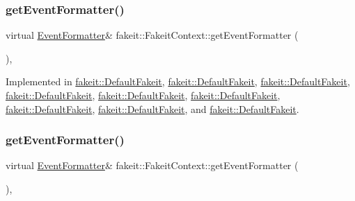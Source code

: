 \mbox{\label{structfakeit_1_1FakeitContext_a066d191292b1002025b02f6569f48b9b}} 
\subsubsection{\texorpdfstring{getEventFormatter()}{getEventFormatter()}\hspace{0.1cm}{\footnotesize\ttfamily [3/9]}}
{\footnotesize\ttfamily virtual \mbox{\hyperlink{structfakeit_1_1EventFormatter}{Event\+Formatter}}\& fakeit\+::\+Fakeit\+Context\+::get\+Event\+Formatter (\begin{DoxyParamCaption}{ }\end{DoxyParamCaption})\hspace{0.3cm}{\ttfamily [protected]}, {}}



Implemented in \mbox{\hyperlink{classfakeit_1_1DefaultFakeit_ae06b5536bcde628ed7e32499eb8b9ac3}{fakeit\+::\+Default\+Fakeit}}, \mbox{\hyperlink{classfakeit_1_1DefaultFakeit_ae06b5536bcde628ed7e32499eb8b9ac3}{fakeit\+::\+Default\+Fakeit}}, \mbox{\hyperlink{classfakeit_1_1DefaultFakeit_ae06b5536bcde628ed7e32499eb8b9ac3}{fakeit\+::\+Default\+Fakeit}}, \mbox{\hyperlink{classfakeit_1_1DefaultFakeit_ae06b5536bcde628ed7e32499eb8b9ac3}{fakeit\+::\+Default\+Fakeit}}, \mbox{\hyperlink{classfakeit_1_1DefaultFakeit_ae06b5536bcde628ed7e32499eb8b9ac3}{fakeit\+::\+Default\+Fakeit}}, \mbox{\hyperlink{classfakeit_1_1DefaultFakeit_ae06b5536bcde628ed7e32499eb8b9ac3}{fakeit\+::\+Default\+Fakeit}}, \mbox{\hyperlink{classfakeit_1_1DefaultFakeit_ae06b5536bcde628ed7e32499eb8b9ac3}{fakeit\+::\+Default\+Fakeit}}, \mbox{\hyperlink{classfakeit_1_1DefaultFakeit_ae06b5536bcde628ed7e32499eb8b9ac3}{fakeit\+::\+Default\+Fakeit}}, and \mbox{\hyperlink{classfakeit_1_1DefaultFakeit_ae06b5536bcde628ed7e32499eb8b9ac3}{fakeit\+::\+Default\+Fakeit}}.

\mbox{\label{structfakeit_1_1FakeitContext_a066d191292b1002025b02f6569f48b9b}} 
\subsubsection{\texorpdfstring{getEventFormatter()}{getEventFormatter()}\hspace{0.1cm}{\footnotesize\ttfamily [4/9]}}
{\footnotesize\ttfamily virtual \mbox{\hyperlink{structfakeit_1_1EventFormatter}{Event\+Formatter}}\& fakeit\+::\+Fakeit\+Context\+::get\+Event\+Formatter (\begin{DoxyParamCaption}{ }\end{DoxyParamCaption})\hspace{0.3cm}{\ttfamily [protected]}, {}}



